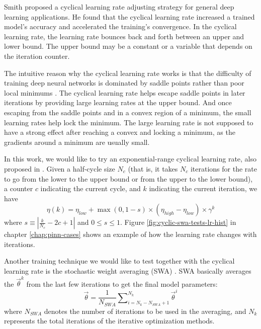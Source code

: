 Smith \cite{smith_cyclical_2017} proposed a cyclical learning rate adjusting strategy for general deep learning applications.
He found that the cyclical learning rate increased a trained model's accuracy and accelerated the training's convergence.
In the cyclical learning rate, the learning rate bounces back and forth between an upper and lower bound.
The upper bound may be a constant or a variable that depends on the iteration counter.

The intuitive reason why the cyclical learning rate works is that the difficulty of training deep neural networks is dominated by saddle points rather than poor local minimums \cite{dauphin_identifying_2014}.
The cyclical learning rate helps escape saddle points in later iterations by providing large learning rates at the upper bound.
And once escaping from the saddle points and in a convex region of a minimum, the small learning rates help lock the minimum.
The large learning rate is not supposed to have a strong effect after reaching a convex and locking a minimum, as the gradients around a minimum are usually small.

In this work, we would like to try an exponential-range cyclical learning rate, also proposed in \cite{smith_cyclical_2017}.
Given a half-cycle size $N_c$ (that is, it takes $N_c$ iterations for the rate to go from the lower to the upper bound or from the upper to the lower bound), a counter $c$ indicating the current cycle, and $k$ indicating the current iteration, we have
\begin{equation}\label{eq:cyclical-learning-rate}
    \eta(k) = \eta_{low} + \max(0, 1-s)\times(\eta_{high}-\eta_{low})\times\gamma^k
\end{equation}
where $s \equiv \left\lvert \frac{k}{N_c} - 2c + 1\right\rvert$ and $0 \le s \le 1$.
Figure \ref{fig:cyclic-swa-tests-lr-hist} in chapter \ref{chap:pinn-cases} shows an example of how the learning rate changes with iterations. 

Another training technique we would like to test together with the cyclical learning rate is the stochastic weight averaging (SWA) \cite{izmailov_averaging_2019}.
SWA basically averages the $\vec{\theta}^k$ from the last few iterations to get the final model parameters:
\begin{equation}
    \vec{\theta} = \frac{1}{N_{SWA}}\sum\nolimits_{i=N_k-N_{SWA}+1}^{N_k} \vec{\theta}^i
\end{equation}
where $N_{SWA}$ denotes the number of iterations to be used in the averaging, and $N_k$ represents the total iterations of the iterative optimization methods.

